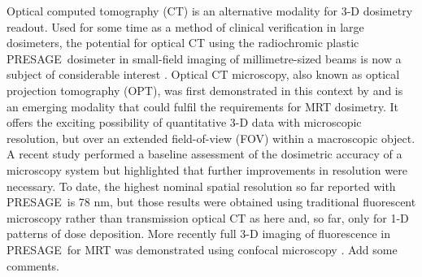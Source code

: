 	Optical computed tomography (CT) \cite{doranthe2009, goreradiation1996}  is an alternative modality for 3-D dosimetry readout. Used for some time as a method of clinical verification in large dosimeters, the potential for optical CT using the radiochromic plastic PRESAGE\textregistered \ dosimeter in small-field imaging of millimetre-sized beams is now a subject of considerable interest \cite{clift2010toward}. Optical CT microscopy, also known as optical projection tomography (OPT), was first demonstrated in this context by \cite{doranan2010} and is an emerging modality that could fulfil the requirements for MRT dosimetry. It offers the exciting possibility of quantitative 3-D data with microscopic resolution, but over an extended field-of-view (FOV) within a macroscopic object. A recent study \cite{doranestablishing2013} performed a baseline assessment of the dosimetric accuracy of a microscopy system but highlighted that further improvements in resolution were necessary. To date, the highest nominal spatial resolution so far reported with PRESAGE\textregistered  \ is 78 nm, but those results were obtained using traditional fluorescent microscopy \cite{annabellevaluating2012} rather than transmission optical CT as here and, so far, only for 1-D patterns of dose deposition. %
	More recently full 3-D imaging of fluorescence in PRESAGE\textregistered \ for MRT was demonstrated using confocal microscopy \cite{gagliardi2015high}. Add some comments.
	
	
